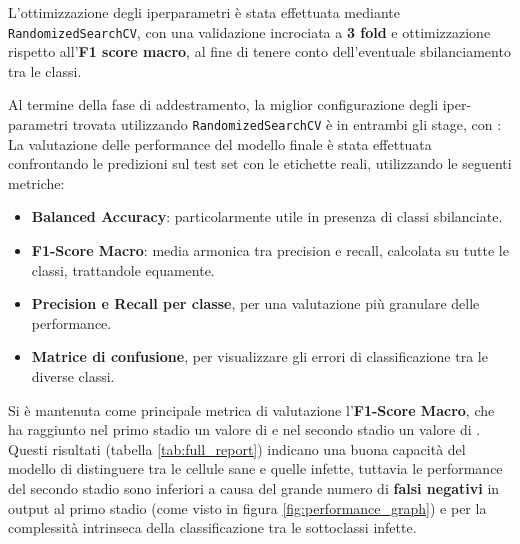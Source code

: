 \documentclass[minted, draw]{../tex/hebdomon}
\newif\ifshowcode
\begin{document}
L'ottimizzazione degli iperparametri è stata effettuata mediante \texttt{RandomizedSearchCV}, con una validazione incrociata a \textbf{3 fold} e ottimizzazione rispetto all'\textbf{F1 score macro}, al fine di tenere conto dell'eventuale sbilanciamento tra le classi.



Al termine della fase di addestramento, la miglior configurazione degli iper-parametri trovata utilizzando \texttt{RandomizedSearchCV} è  in entrambi gli stage, con :\\
\ifshowcode
%
\begin{code}{python}
  param_dist = {
        'selector__k': [700],
        'classifier__C': [100],
        'classifier__kernel': ['poly'],
        'classifier__gamma': ['auto'] 
    }
\end{code}
%
\fi
La valutazione delle performance del modello finale è stata effettuata confrontando le predizioni sul test set con le etichette reali, utilizzando le seguenti metriche:

\begin{itemize}
\item \textbf{Balanced Accuracy}: particolarmente utile in presenza di classi sbilanciate.
\item \textbf{F1-Score Macro}: media armonica tra precision e recall, calcolata su tutte le classi, trattandole equamente.
\item \textbf{Precision e Recall per classe}, per una valutazione più granulare delle performance.
\item \textbf{Matrice di confusione}, per visualizzare gli errori di classificazione tra le diverse classi.
\end{itemize}


Si è mantenuta come principale metrica di valutazione l'\textbf{F1-Score Macro}, che ha raggiunto nel primo stadio un valore di  e nel secondo stadio un valore di . Questi risultati (tabella \ref{tab:full_report}) indicano una buona capacità del modello di distinguere tra le cellule sane e quelle infette, tuttavia le performance del secondo stadio sono inferiori a causa del grande numero di \textbf{falsi negativi} in output al primo stadio (come visto in figura \ref{fig:performance_graph}) e per la complessità intrinseca della classificazione tra le sottoclassi infette.
\end{document}
